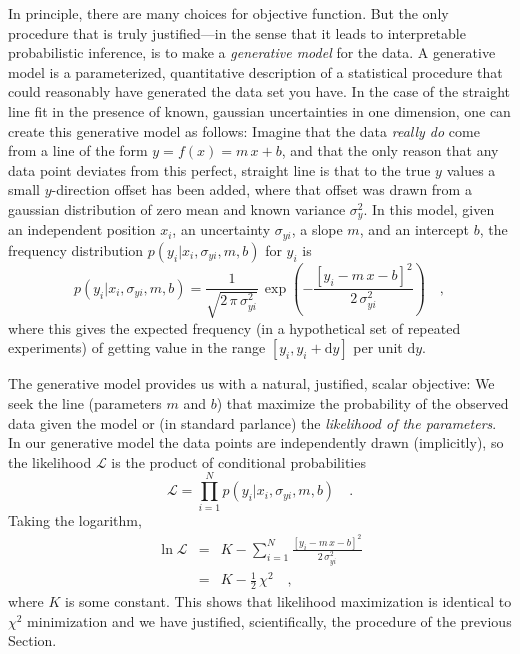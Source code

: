 \documentclass[12pt,twoside]{article}
\newcommand{\sectionname}{Section}
\renewcommand{\d}{\mathrm{d}}
\newcommand{\like}{\mathscr{L}}
\begin{document}
In principle, there are many choices for objective function.  But the
only procedure that is truly justified---in the sense that it leads to
interpretable probabilistic inference, is to make a \emph{generative
  model} for the data.  A generative model is a parameterized,
quantitative description of a statistical procedure that could
reasonably have generated the data set you have.  In the case of the
straight line fit in the presence of known, gaussian uncertainties in
one dimension, one can create this generative model as follows:
Imagine that the data \emph{really do} come from a line of the form $y
= f(x) = m\,x+b$, and that the only reason that any data point
deviates from this perfect, straight line is that to the true $y$
values a small $y$-direction offset has been added, where that offset
was drawn from a gaussian distribution of zero mean and known variance
$\sigma_y^2$.  In this model, given an independent position $x_i$, an
uncertainty $\sigma_{yi}$, a slope $m$, and an intercept $b$, the
frequency distribution $p(y_i|x_i,\sigma_{yi},m,b)$ for $y_i$ is
\begin{equation}\label{eq:objectivei}
p(y_i|x_i,\sigma_{yi},m,b) = \frac{1}{\sqrt{2\,\pi\,\sigma_{yi}^2}}
 \,\exp\left(-\frac{[y_i - m\,x - b]^2}{2\,\sigma_{yi}^2}\right) \quad ,
\end{equation}
where this gives the expected frequency (in a hypothetical set of
repeated experiments) of getting value in the range $[y_i,y_i+\d y]$
per unit $\d y$.

The generative model provides us with a natural, justified, scalar
objective: We seek the line (parameters $m$ and $b$) that maximize the
probability of the observed data given the model or (in standard
parlance) the \emph{likelihood of the parameters}.  In our generative
model the data points are independently drawn (implicitly), so the
likelihood $\like$ is the product of conditional probabilities
\begin{equation}\label{eq:like}
\like = \prod_{i=1}^N p(y_i|x_i,\sigma_{yi},m,b) \quad .
\end{equation}
Taking the logarithm,
\begin{eqnarray}\displaystyle
\ln\like
 & = & K - \sum_{i=1}^N \frac{[y_i - m\,x - b]^2}{2\,\sigma_{yi}^2} \nonumber\\
 & = & K - \frac{1}{2}\,\chi^2 \quad ,
\end{eqnarray}
where $K$ is some constant.  This shows that likelihood maximization
is identical to $\chi^2$ minimization and we have justified,
scientifically, the procedure of the previous \sectionname.
\end{document}

